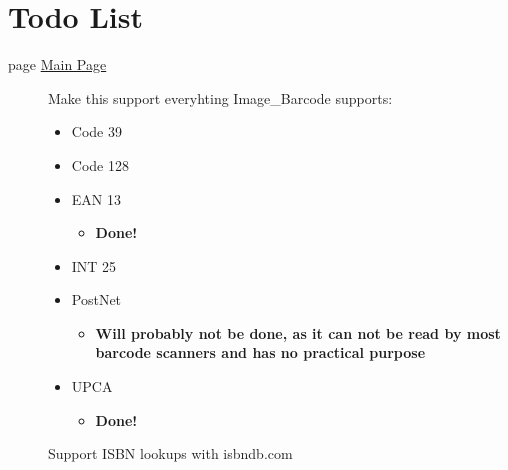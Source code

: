 \hypertarget{todo}{}\section{Todo List}\label{todo}
\label{todo__todo000001}
\hypertarget{todo__todo000001}{}
 \begin{description}
\item[page \hyperlink{index}{Main Page} ]Make this support everyhting Image\_\-Barcode supports:\begin{itemize}
\item Code 39\item Code 128\item EAN 13\begin{itemize}
\item {\bf Done!} \end{itemize}
\item INT 25\item PostNet\begin{itemize}
\item {\bf Will probably not be done, as it can not be read by most barcode scanners and has no practical purpose}\end{itemize}
\item UPCA\begin{itemize}
\item {\bf Done!} \end{itemize}
\end{itemize}


Support ISBN lookups with isbndb.com

\end{description}

